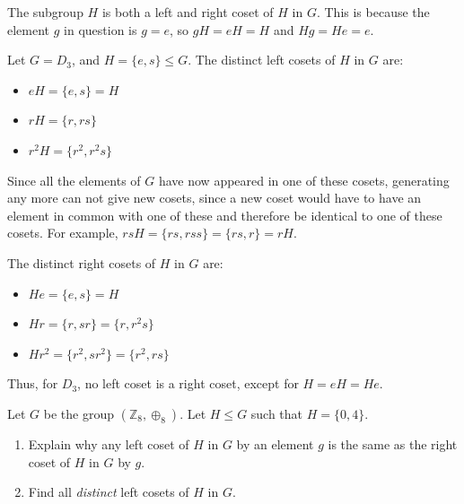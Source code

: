 \begin{remark}
    The subgroup $H$ is both a left and right coset of $H$ in $G$. This is because the element $g$ in question is $g = e$, so $gH = eH = H$ and $Hg = He = e$.
\end{remark}

\begin{example}
    Let $G = D_3$, and $H = \{e, s\} \leq G$. The distinct left cosets of $H$ in $G$ are:
    \begin{itemize}
        \item $eH = \{e, s\} = H$
        \item $rH = \{r, rs\}$
        \item $r^2H = \{r^2, r^2s\}$
    \end{itemize}
    Since all the elements of $G$ have now appeared in one of these cosets, generating any more can not give new cosets, since a new coset would have to have an element in common with one of these and therefore be identical to one of these cosets. For example, $rsH = \{rs, rss\} = \{rs, r\} = rH$.

    The distinct right cosets of $H$ in $G$ are:
    \begin{itemize}
        \item $He = \{e, s\} = H$
        \item $Hr = \{r, sr\} = \{r, r^2s\}$
        \item $Hr^2 = \{r^2, sr^2\} = \{r^2, rs\}$
    \end{itemize}
    Thus, for $D_3$, no left coset is a right coset, except for $H = eH = He$.
\end{example}

\newpage

\begin{exercise}
    Let $G$ be the group $(\mathbb{Z}_8, \oplus_8)$. Let $H \leq G$ such that $H
 = \{0, 4\}$.
    \begin{enumerate}[label=(\alph*)]
        \item Explain why any left coset of $H$ in $G$ by an element $g$ is the same as the right coset of $H$ in $G$ by $g$.
        \item Find all \textit{distinct} left cosets of $H$ in $G$.
    \end{enumerate}
\end{exercise}

